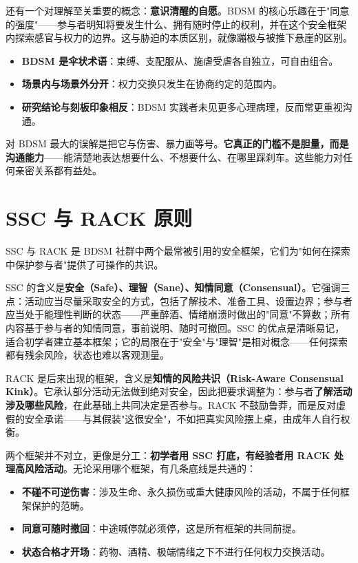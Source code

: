 \documentclass[12pt,UTF8]{ctexbook}
\newcommand{\keyword}[1]{\textbf{#1}}
\begin{document}
还有一个对理解至关重要的概念：\keyword{意识清醒的自愿}。BDSM 的核心乐趣在于"同意的强度"——参与者明知将要发生什么、拥有随时停止的权利，并在这个安全框架内探索感官与权力的边界。这与胁迫的本质区别，就像蹦极与被推下悬崖的区别。

\begin{itemize}
  \item \keyword{BDSM 是伞状术语}：束缚、支配服从、施虐受虐各自独立，可自由组合。
  \item \keyword{场景内与场景外分开}：权力交换只发生在协商约定的范围内。
  \item \keyword{研究结论与刻板印象相反}：BDSM 实践者未见更多心理病理，反而常更重视沟通\citep{wismeijer2013,richters2008}。
\end{itemize}

\begin{tcolorbox}[colback=pink!5!white,colframe=red!50!black,title=贴心小叮咛]
对 BDSM 最大的误解是把它与伤害、暴力画等号。\keyword{它真正的门槛不是胆量，而是沟通能力}——能清楚地表达想要什么、不想要什么、在哪里踩刹车。这些能力对任何亲密关系都有益处。
\end{tcolorbox}
\section{SSC 与 RACK 原则}

SSC 与 RACK 是 BDSM 社群中两个最常被引用的安全框架，它们为"如何在探索中保护参与者"提供了可操作的共识。

SSC 的含义是\keyword{安全（Safe）、理智（Sane）、知情同意（Consensual）}。它强调三点：活动应当尽量采取安全的方式，包括了解技术、准备工具、设置边界；参与者应当处于能理性判断的状态——严重醉酒、情绪崩溃时做出的"同意"不算数；所有内容基于参与者的知情同意，事前说明、随时可撤回。SSC 的优点是清晰易记，适合初学者建立基本框架；它的局限在于"安全"与"理智"是相对概念——任何探索都有残余风险，状态也难以客观测量。

RACK 是后来出现的框架，含义是\keyword{知情的风险共识（Risk-Aware Consensual Kink）}。它承认部分活动无法做到绝对安全，因此把要求调整为：参与者\keyword{了解活动涉及哪些风险}，在此基础上共同决定是否参与。RACK 不鼓励鲁莽，而是反对虚假的安全承诺——与其假装"这很安全"，不如把真实风险摆上桌，由成年人自行权衡。

两个框架并不对立，更像是分工：\keyword{初学者用 SSC 打底，有经验者用 RACK 处理高风险活动}。无论采用哪个框架，有几条底线是共通的：

\begin{itemize}
  \item \keyword{不碰不可逆伤害}：涉及生命、永久损伤或重大健康风险的活动，不属于任何框架保护的范畴。
  \item \keyword{同意可随时撤回}：中途喊停就必须停，这是所有框架的共同前提。
  \item \keyword{状态合格才开场}：药物、酒精、极端情绪之下不进行任何权力交换活动。
\end{itemize}
\end{document}
